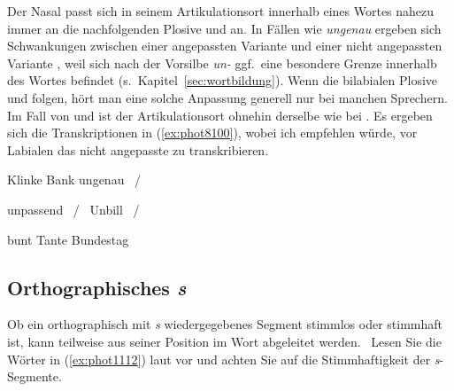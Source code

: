 Der Nasal \textipa{[n]} passt sich in seinem Artikulationsort innerhalb eines Wortes nahezu immer an die nachfolgenden Plosive \textipa{[k]} und \textipa{[g]} an.
In Fällen wie \textit{ungenau} ergeben sich Schwankungen zwischen einer angepassten Variante \textipa{[PUNgen\t{aO}]} und einer nicht angepassten Variante \textipa{[PUngen\t{aO}]}, weil sich nach der Vorsilbe \textit{un-} ggf.\ eine besondere Grenze innerhalb des Wortes befindet (s.\ Kapitel~\ref{sec:wortbildung}).
Wenn die bilabialen Plosive \textipa{[p]} und \textipa{[b]} folgen, hört man eine solche Anpassung generell nur bei manchen Sprechern.
Im Fall von \textipa{[t]} und \textipa{[d]} ist der Artikulationsort ohnehin derselbe wie bei \textipa{[n]}.
Es ergeben sich die Transkriptionen in (\ref{ex:phot8100}), wobei ich empfehlen würde, vor Labialen das nicht angepasste \textipa{[n]} zu transkribieren.

\begin{exe}
    \ex\label{ex:phot8100}
    \begin{xlist}
      \ex Klinke \textipa{[klINk@]}
      \ex Bank \textipa{[baNk]}
      \ex ungenau \textipa{[PUng@n\t{aO}]}~\slash~\textipa{[PUNg@n\t{aO}]}
    \end{xlist}
    \ex\label{ex:phot8101}
    \begin{xlist}
      \ex unpassend \textipa{[PUmpas@nt]}~\slash~\textipa{[PUnpas@nt]}
      \ex Unbill \textipa{[PUmbIl]}~\slash~\textipa{[PUnbIl]}
    \end{xlist}
    \ex\label{ex:phot8102}
    \begin{xlist}
      \ex bunt \textipa{[bUnt]}
      \ex Tante \textipa{[tant@]}
      \ex Bundestag 
    \end{xlist}
\end{exe}

\subsection{Orthographisches \textit{s}}

\label{sec:orthographischess}

Ob ein orthographisch mit \textit{s} wiedergegebenes Segment stimmlos \textipa{[s]} oder stimmhaft \textipa{[z]} ist, kann teilweise aus seiner Position im Wort abgeleitet werden.
\TuBegin~Lesen Sie die Wörter in (\ref{ex:phot1112}) laut vor und achten Sie auf die Stimmhaftigkeit der \textit{s}-Segmente.

\begin{exe}
  \ex\label{ex:phot1112}
  \begin{xlist}
  \end{xlist}
\end{exe}

